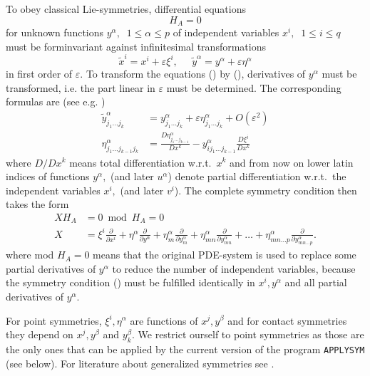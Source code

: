 To obey classical Lie-symmetries, differential equations
\begin{equation}
H_A = 0              \label{PDEs}
\end{equation}
for unknown functions $y^\alpha,\;\;1\leq \alpha \leq p$
of independent variables $x^i,\;\;1\leq i \leq q$
must be forminvariant against infinitesimal transformations
\begin{equation}
\tilde{x}^i = x^i + \varepsilon \xi^i, \;\; \;\;\;
        \tilde{y}^\alpha = y^\alpha + \varepsilon \eta^\alpha  \label{tran}
\end{equation}
in first order of $\varepsilon.$ To transform the equations ()
by (), derivatives of $y^\alpha$ must be transformed, i.e. the part
linear in $\varepsilon$ must be determined. The corresponding formulas are
(see e.g. \cite{Olver:89,Stephani:89})
\begin{align}
\tilde{y}^\alpha_{j_1\ldots j_k} &=
y^\alpha_{j_1\ldots j_k} + \varepsilon
\eta^\alpha_{j_1\ldots j_k} + O(\varepsilon^2)  \nonumber \\[3mm]
\eta^\alpha_{j_1\ldots j_{k-1}j_k} &=
  \frac{D \eta^\alpha_{j_1\ldots j_{k-1}}}{D x^k} -
  y^\alpha_{ij_1\ldots j_{k-1}}\frac{D \xi^i}{D x^k} \label{recur}
\end{align}
where $D/Dx^k$ means total differentiation w.r.t.\ $x^k$ and
from now on lower latin indices of functions $y^\alpha,$
(and later $u^\alpha$)
denote partial differentiation w.r.t.\ the independent variables $x^i,$
(and later $v^i$).
The complete symmetry condition then takes the form
\begin{align}
X H_A &= 0  \bmod  H_A = 0\  \label{sbed1} \\
X &= \xi^i \frac{\partial}{\partial x^i} +
 \eta^\alpha \frac{\partial}{\partial y^\alpha} +
 \eta^\alpha_m \frac{\partial}{\partial y^\alpha_m} +
 \eta^\alpha_{mn} \frac{\partial}{\partial y^\alpha_{mn}} + \ldots +
 \eta^\alpha_{mn\ldots p} \frac{\partial}{\partial y^\alpha_{mn\ldots p}}.
\label{sbed2}
\end{align}
where mod $H_A = 0$ means that the original PDE-system is used to replace
some partial derivatives of $y^\alpha$ to reduce the number of independent
variables, because the symmetry condition () must be
fulfilled identically in $x^i, y^\alpha$ and all partial
derivatives of $y^\alpha.$

For point symmetries, $\xi^i, \eta^\alpha$ are functions of $x^j,
y^\beta$ and for contact symmetries they depend on $x^j, y^\beta$ and
$y^\beta_k.$ We restrict ourself to point symmetries as those are the only
ones that can be applied by the current version of the program \texttt{APPLYSYM}
(see below). For literature about generalized symmetries see \cite{Hereman:95}.


